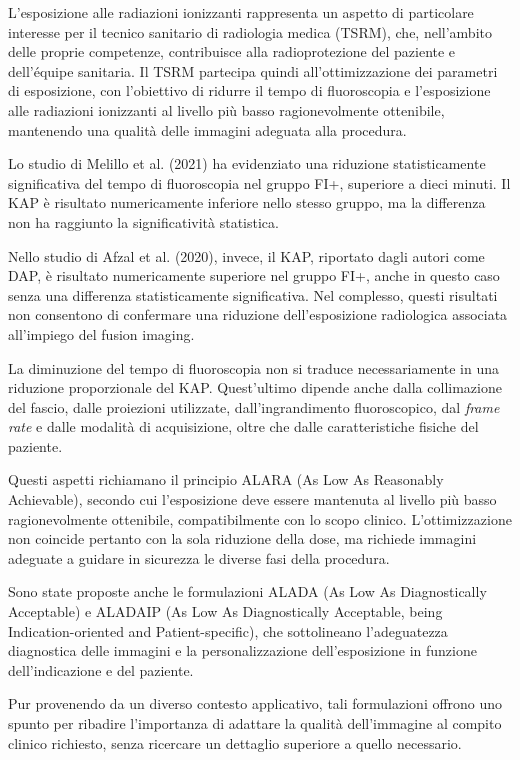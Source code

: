 \documentclass[12pt,a4paper,twoside]{article}
\begin{document}
L'esposizione alle radiazioni ionizzanti rappresenta un aspetto di particolare interesse per il tecnico sanitario di radiologia medica (TSRM), che, nell'ambito delle proprie competenze, contribuisce alla radioprotezione del paziente e dell'équipe sanitaria. Il TSRM partecipa quindi all'ottimizzazione dei parametri di esposizione, con l'obiettivo di ridurre il tempo di fluoroscopia e l'esposizione alle radiazioni ionizzanti al livello più basso ragionevolmente ottenibile, mantenendo una qualità delle immagini adeguata alla procedura.

Lo studio di Melillo et al. (2021) ha evidenziato una riduzione statisticamente significativa del tempo di fluoroscopia nel gruppo FI+, superiore a dieci minuti. Il KAP è risultato numericamente inferiore nello stesso gruppo, ma la differenza non ha raggiunto la significatività statistica. \cite{ref26}

Nello studio di Afzal et al. (2020), invece, il KAP, riportato dagli autori come DAP, è risultato numericamente superiore nel gruppo FI+, anche in questo caso senza una differenza statisticamente significativa. Nel complesso, questi risultati non consentono di confermare una riduzione dell'esposizione radiologica associata all'impiego del fusion imaging. \cite{ref25,ref26}

La diminuzione del tempo di fluoroscopia non si traduce necessariamente in una riduzione proporzionale del KAP. Quest'ultimo dipende anche dalla collimazione del fascio, dalle proiezioni utilizzate, dall'ingrandimento fluoroscopico, dal \emph{frame rate} e dalle modalità di acquisizione, oltre che dalle caratteristiche fisiche del paziente.

Questi aspetti richiamano il principio ALARA (As Low As Reasonably Achievable), secondo cui l'esposizione deve essere mantenuta al livello più basso ragionevolmente ottenibile, compatibilmente con lo scopo clinico. L'ottimizzazione non coincide pertanto con la sola riduzione della dose, ma richiede immagini adeguate a guidare in sicurezza le diverse fasi della procedura.

Sono state proposte anche le formulazioni ALADA (As Low As Diagnostically Acceptable) e ALADAIP (As Low As Diagnostically Acceptable, being Indication-oriented and Patient-specific), che sottolineano l'adeguatezza diagnostica delle immagini e la personalizzazione dell'esposizione in funzione dell'indicazione e del paziente.

Pur provenendo da un diverso contesto applicativo, tali formulazioni offrono uno spunto per ribadire l'importanza di adattare la qualità dell'immagine al compito clinico richiesto, senza ricercare un dettaglio superiore a quello necessario. \cite{ref27,ref28}
\end{document}
